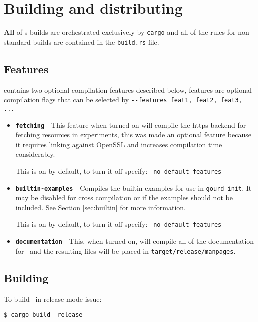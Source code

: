 \section{Building and distributing}

\textbf{All} of {\gourd}s builds are orchestrated exclusively by \texttt{cargo}
and all of the rules for non standard builds are contained in the \texttt{build.rs} file.


\subsection{Features}

\gourd contains two optional compilation features described below,
features are optional compilation flags that can be selected by
\texttt{-{}-features feat1, feat2, feat3, ...}

\begin{itemize}
\item \textbf{\texttt{fetching}} -
  This feature when turned on will compile the https backend for fetching resources
  in experiments, this was made an optional feature because it requires linking against
  OpenSSL and increases compilation time considerably.

  This is on by default, to turn it off specify: \texttt{--no-default-features}

\item \textbf{\texttt{builtin-examples}} -
  Compiles the builtin examples for use in \texttt{gourd init}. It may be
  disabled for cross compilation or if the examples should not
  be included. See Section \ref{sec:builtin} for more information.

  This is on by default, to turn it off specify: \texttt{--no-default-features}

\item \textbf{\texttt{documentation}} -
  This, when turned on, will compile all of the documentation for \gourd\ and
  the resulting files will be placed in \texttt{target/release/manpages}.
\end{itemize}

\subsection{Building}

To build \gourd\ in release mode issue:

\texttt{\$ cargo build --release}
\vspace{0.5cm}

